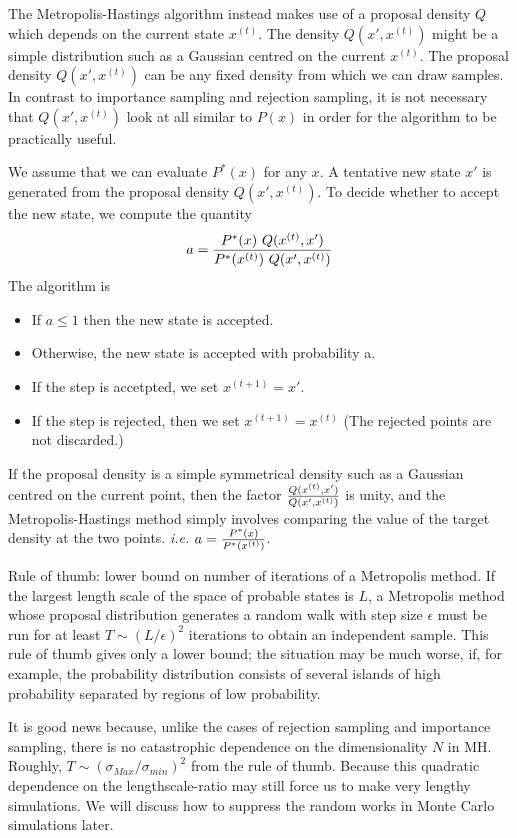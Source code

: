 \documentclass[a4paper,11pt]{article}
\numberwithin{equation}{section}
\begin{document}
{The Metropolis-Hastings algorithm instead makes use of a proposal density
$Q$ which depends on the current state $x^{(t)}$. The density $Q(x', x^{(t)})$ might
be a simple distribution such as a Gaussian centred on the current $x^{(t)}$. The
proposal density $Q(x', x^{(t)})$ can be any fixed density from which we can draw
samples. In contrast to importance sampling and rejection sampling, it is not
necessary that $Q(x', x^{(t)})$ look at all similar to $P(x)$ in order for the algorithm
to be practically useful.

We assume that we can evaluate $P^*(x)$ for any $x$. A tentative
new state $x'$ is generated from the proposal density $Q(x', x^{(t)})$. To decide whether to accept the new state, we compute the quantity
$$
a= {P^*(x)~Q( x^{(t)},x') \over P^*(x^{(t)})~Q(x', x^{(t)}) }
$$
The algorithm is 

\begin{itemize}
  \item If $a \le 1$ then the new state is accepted.  
  \item Otherwise, the new state is accepted with probability a. 
  \item If the step is accetpted, we set $x^{(t+1)}=x'$.
  \item If the step is rejected, then we set $x^{(t+1)}=x^{(t)}$ (The rejected points are not discarded.)
\end{itemize}

If the
proposal density is a simple symmetrical density such as a Gaussian centred on
the current point, then the factor ${Q( x^{(t)},x') \over Q(x', x^{(t)}) }$ is unity, and the Metropolis-Hastings
method simply involves comparing the value of the target density at the two
points. {\it i.e.} $a={P^*(x) \over P^*(x^{(t)})}$.

Rule of thumb: lower bound on number of iterations of a
Metropolis method. If the largest length scale of the space of
probable states is $L$, a Metropolis method whose proposal distribution
generates a random walk with step size $\epsilon$ must be run for at
least $T \sim (L/\epsilon)^2$ iterations to obtain an independent sample. This rule of thumb gives only a lower bound; the situation may be much
worse, if, for example, the probability distribution consists of several islands
of high probability separated by regions of low probability.

It is good news because, unlike the
cases of rejection sampling and importance sampling, there is no catastrophic
dependence on the dimensionality $N$ in MH. Roughly, $T \sim (\sigma_{Max}/\sigma_{min})^2$ from the rule of thumb. Because this quadratic dependence on the lengthscale-ratio may still force us
to make very lengthy simulations. We will discuss how to suppress the random works in Monte Carlo simulations later. 

}
\end{document}
